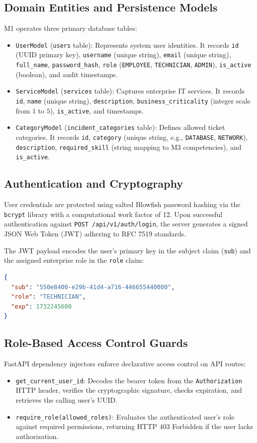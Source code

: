 \documentclass[11pt,a4paper,oneside]{report}
\begin{document}
\subsection{Domain Entities and Persistence Models}
M1 operates three primary database tables:
\begin{itemize}
    \item \texttt{UserModel} (\texttt{users} table): Represents system user identities. It records \texttt{id} (UUID primary key), \texttt{username} (unique string), \texttt{email} (unique string), \texttt{full\_name}, \texttt{password\_hash}, \texttt{role} (\texttt{EMPLOYEE}, \texttt{TECHNICIAN}, \texttt{ADMIN}), \texttt{is\_active} (boolean), and audit timestamps.
    \item \texttt{ServiceModel} (\texttt{services} table): Captures enterprise IT services. It records \texttt{id}, \texttt{name} (unique string), \texttt{description}, \texttt{business\_criticality} (integer scale from $1$ to $5$), \texttt{is\_active}, and timestamps.
    \item \texttt{CategoryModel} (\texttt{incident\_categories} table): Defines allowed ticket categories. It records \texttt{id}, \texttt{category} (unique string, e.g., \texttt{DATABASE}, \texttt{NETWORK}), \texttt{description}, \texttt{required\_skill} (string mapping to M3 competencies), and \texttt{is\_active}.
\end{itemize}

\subsection{Authentication and Cryptography}
User credentials are protected using salted Blowfish password hashing via the \texttt{bcrypt} library with a computational work factor of 12. Upon successful authentication against \texttt{POST /api/v1/auth/login}, the server generates a signed JSON Web Token (JWT) adhering to RFC 7519 standards. 

The JWT payload encodes the user's primary key in the subject claim (\texttt{sub}) and the assigned enterprise role in the \texttt{role} claim:
\begin{lstlisting}[language=json, caption={JWT Token Claims Payload}]
{
  "sub": "550e8400-e29b-41d4-a716-446655440000",
  "role": "TECHNICIAN",
  "exp": 1732245600
}
\end{lstlisting}

\subsection{Role-Based Access Control Guards}
FastAPI dependency injectors enforce declarative access control on API routes:
\begin{itemize}
    \item \texttt{get\_current\_user\_id}: Decodes the bearer token from the \texttt{Authorization} HTTP header, verifies the cryptographic signature, checks expiration, and retrieves the calling user's UUID.
    \item \texttt{require\_role(allowed\_roles)}: Evaluates the authenticated user's role against required permissions, returning HTTP 403 Forbidden if the user lacks authorization.
\end{itemize}
\end{document}
